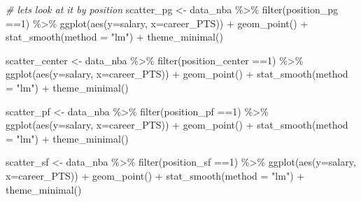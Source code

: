\documentclass[
]{book}
\newenvironment{Shaded}{\begin{snugshade}}{\end{snugshade}}
\newcommand{\AttributeTok}[1]{\textcolor[rgb]{0.77,0.63,0.00}{#1}}
\newcommand{\CommentTok}[1]{\textcolor[rgb]{0.56,0.35,0.01}{\textit{#1}}}
\newcommand{\DecValTok}[1]{\textcolor[rgb]{0.00,0.00,0.81}{#1}}
\newcommand{\FunctionTok}[1]{\textcolor[rgb]{0.00,0.00,0.00}{#1}}
\newcommand{\NormalTok}[1]{#1}
\newcommand{\OtherTok}[1]{\textcolor[rgb]{0.56,0.35,0.01}{#1}}
\newcommand{\SpecialCharTok}[1]{\textcolor[rgb]{0.00,0.00,0.00}{#1}}
\newcommand{\StringTok}[1]{\textcolor[rgb]{0.31,0.60,0.02}{#1}}
\begin{document}
\begin{Shaded}
\begin{Highlighting}[]
\CommentTok{\# let\textquotesingle{}s look at it by position}
\NormalTok{scatter\_pg }\OtherTok{\textless{}{-}}\NormalTok{ data\_nba }\SpecialCharTok{\%\textgreater{}\%} \FunctionTok{filter}\NormalTok{(position\_pg }\SpecialCharTok{==}\DecValTok{1}\NormalTok{) }\SpecialCharTok{\%\textgreater{}\%}
  \FunctionTok{ggplot}\NormalTok{(}\FunctionTok{aes}\NormalTok{(}\AttributeTok{y=}\NormalTok{salary, }\AttributeTok{x=}\NormalTok{career\_PTS)) }\SpecialCharTok{+}
    \FunctionTok{geom\_point}\NormalTok{() }\SpecialCharTok{+} 
     \FunctionTok{stat\_smooth}\NormalTok{(}\AttributeTok{method =} \StringTok{"lm"}\NormalTok{) }\SpecialCharTok{+} 
       \FunctionTok{theme\_minimal}\NormalTok{()}

\NormalTok{scatter\_center }\OtherTok{\textless{}{-}}\NormalTok{ data\_nba }\SpecialCharTok{\%\textgreater{}\%} \FunctionTok{filter}\NormalTok{(position\_center }\SpecialCharTok{==}\DecValTok{1}\NormalTok{) }\SpecialCharTok{\%\textgreater{}\%}
  \FunctionTok{ggplot}\NormalTok{(}\FunctionTok{aes}\NormalTok{(}\AttributeTok{y=}\NormalTok{salary, }\AttributeTok{x=}\NormalTok{career\_PTS)) }\SpecialCharTok{+}
    \FunctionTok{geom\_point}\NormalTok{() }\SpecialCharTok{+} 
     \FunctionTok{stat\_smooth}\NormalTok{(}\AttributeTok{method =} \StringTok{"lm"}\NormalTok{) }\SpecialCharTok{+} 
       \FunctionTok{theme\_minimal}\NormalTok{()}

\NormalTok{scatter\_pf }\OtherTok{\textless{}{-}}\NormalTok{ data\_nba }\SpecialCharTok{\%\textgreater{}\%} \FunctionTok{filter}\NormalTok{(position\_pf }\SpecialCharTok{==}\DecValTok{1}\NormalTok{) }\SpecialCharTok{\%\textgreater{}\%}
  \FunctionTok{ggplot}\NormalTok{(}\FunctionTok{aes}\NormalTok{(}\AttributeTok{y=}\NormalTok{salary, }\AttributeTok{x=}\NormalTok{career\_PTS)) }\SpecialCharTok{+}
    \FunctionTok{geom\_point}\NormalTok{() }\SpecialCharTok{+} 
     \FunctionTok{stat\_smooth}\NormalTok{(}\AttributeTok{method =} \StringTok{"lm"}\NormalTok{) }\SpecialCharTok{+} 
       \FunctionTok{theme\_minimal}\NormalTok{()}

\NormalTok{scatter\_sf }\OtherTok{\textless{}{-}}\NormalTok{ data\_nba }\SpecialCharTok{\%\textgreater{}\%} \FunctionTok{filter}\NormalTok{(position\_sf }\SpecialCharTok{==}\DecValTok{1}\NormalTok{) }\SpecialCharTok{\%\textgreater{}\%}
  \FunctionTok{ggplot}\NormalTok{(}\FunctionTok{aes}\NormalTok{(}\AttributeTok{y=}\NormalTok{salary, }\AttributeTok{x=}\NormalTok{career\_PTS)) }\SpecialCharTok{+}
    \FunctionTok{geom\_point}\NormalTok{() }\SpecialCharTok{+} 
     \FunctionTok{stat\_smooth}\NormalTok{(}\AttributeTok{method =} \StringTok{"lm"}\NormalTok{) }\SpecialCharTok{+} 
       \FunctionTok{theme\_minimal}\NormalTok{()}


\end{Highlighting}
\end{Shaded}
\end{document}
